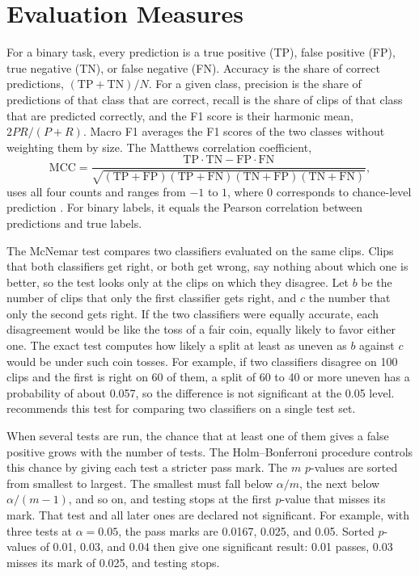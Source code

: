 
\section{Evaluation Measures}
\label{sec:measures}

For a binary task, every prediction is a true positive (TP), false positive (FP), true negative (TN), or false negative (FN). Accuracy is the share of correct predictions, $(\mathrm{TP} + \mathrm{TN}) / N$. For a given class, precision is the share of predictions of that class that are correct, recall is the share of clips of that class that are predicted correctly, and the F1 score is their harmonic mean, $2PR/(P + R)$. Macro F1 averages the F1 scores of the two classes without weighting them by size. The Matthews correlation coefficient,
\begin{equation}
   \mathrm{MCC} = \frac{\mathrm{TP} \cdot \mathrm{TN} - \mathrm{FP} \cdot \mathrm{FN}}{\sqrt{(\mathrm{TP}+\mathrm{FP})(\mathrm{TP}+\mathrm{FN})(\mathrm{TN}+\mathrm{FP})(\mathrm{TN}+\mathrm{FN})}},
   \label{eq:mcc}
\end{equation}
uses all four counts and ranges from $-1$ to $1$, where 0 corresponds to chance-level prediction \cite{chicco2020}. For binary labels, it equals the Pearson correlation between predictions and true labels.

The McNemar test \cite{mcnemar1947} compares two classifiers evaluated on the same clips. Clips that both classifiers get right, or both get wrong, say nothing about which one is better, so the test looks only at the clips on which they disagree. Let $b$ be the number of clips that only the first classifier gets right, and $c$ the number that only the second gets right. If the two classifiers were equally accurate, each disagreement would be like the toss of a fair coin, equally likely to favor either one. The exact test computes how likely a split at least as uneven as $b$ against $c$ would be under such coin tosses. For example, if two classifiers disagree on 100 clips and the first is right on 60 of them, a split of 60 to 40 or more uneven has a probability of about 0.057, so the difference is not significant at the 0.05 level.  recommends this test for comparing two classifiers on a single test set.

When several tests are run, the chance that at least one of them gives a false positive grows with the number of tests. The Holm--Bonferroni procedure \cite{holm1979} controls this chance by giving each test a stricter pass mark. The $m$ $p$-values are sorted from smallest to largest. The smallest must fall below $\alpha / m$, the next below $\alpha / (m - 1)$, and so on, and testing stops at the first $p$-value that misses its mark. That test and all later ones are declared not significant. For example, with three tests at $\alpha = 0.05$, the pass marks are 0.0167, 0.025, and 0.05. Sorted $p$-values of 0.01, 0.03, and 0.04 then give one significant result: 0.01 passes, 0.03 misses its mark of 0.025, and testing stops.


